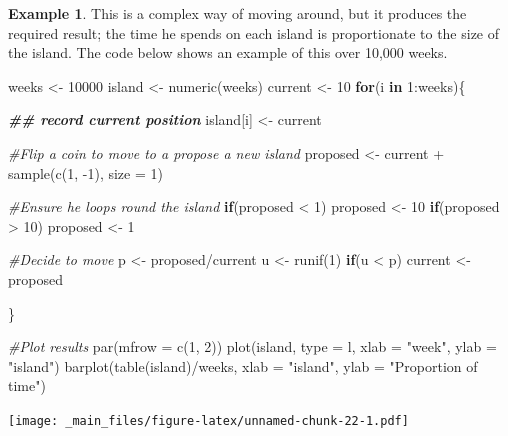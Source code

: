 \documentclass[
]{book}
\newenvironment{Shaded}{\begin{snugshade}}{\end{snugshade}}
\newcommand{\AttributeTok}[1]{\textcolor[rgb]{0.77,0.63,0.00}{#1}}
\newcommand{\CommentTok}[1]{\textcolor[rgb]{0.56,0.35,0.01}{\textit{#1}}}
\newcommand{\ControlFlowTok}[1]{\textcolor[rgb]{0.13,0.29,0.53}{\textbf{#1}}}
\newcommand{\DecValTok}[1]{\textcolor[rgb]{0.00,0.00,0.81}{#1}}
\newcommand{\DocumentationTok}[1]{\textcolor[rgb]{0.56,0.35,0.01}{\textbf{\textit{#1}}}}
\newcommand{\FunctionTok}[1]{\textcolor[rgb]{0.00,0.00,0.00}{#1}}
\newcommand{\NormalTok}[1]{#1}
\newcommand{\OtherTok}[1]{\textcolor[rgb]{0.56,0.35,0.01}{#1}}
\newcommand{\SpecialCharTok}[1]{\textcolor[rgb]{0.00,0.00,0.00}{#1}}
\newcommand{\StringTok}[1]{\textcolor[rgb]{0.31,0.60,0.02}{#1}}
\theoremstyle{definition}
\theoremstyle{definition}
\newtheorem{example}{Example}[chapter]
\theoremstyle{definition}
\theoremstyle{definition}
\theoremstyle{remark}
\begin{document}
\begin{example}
This is a complex way of moving around, but it produces the required result; the time he spends on each island is proportionate to the size of the island. The code below shows an example of this over 10,000 weeks.

\begin{Shaded}
\begin{Highlighting}[]
\NormalTok{weeks }\OtherTok{\textless{}{-}} \DecValTok{10000}
\NormalTok{island }\OtherTok{\textless{}{-}} \FunctionTok{numeric}\NormalTok{(weeks)}
\NormalTok{current }\OtherTok{\textless{}{-}} \DecValTok{10}
\ControlFlowTok{for}\NormalTok{(i }\ControlFlowTok{in} \DecValTok{1}\SpecialCharTok{:}\NormalTok{weeks)\{}
  
  \DocumentationTok{\#\# record current position}
\NormalTok{  island[i] }\OtherTok{\textless{}{-}}\NormalTok{ current}
  
  \CommentTok{\#Flip a coin to move to a propose a new island}
\NormalTok{  proposed }\OtherTok{\textless{}{-}}\NormalTok{ current }\SpecialCharTok{+} \FunctionTok{sample}\NormalTok{(}\FunctionTok{c}\NormalTok{(}\DecValTok{1}\NormalTok{, }\SpecialCharTok{{-}}\DecValTok{1}\NormalTok{), }\AttributeTok{size =} \DecValTok{1}\NormalTok{)}
  
  \CommentTok{\#Ensure he loops round the island}
  \ControlFlowTok{if}\NormalTok{(proposed }\SpecialCharTok{\textless{}} \DecValTok{1}\NormalTok{) }
\NormalTok{    proposed }\OtherTok{\textless{}{-}} \DecValTok{10}
  \ControlFlowTok{if}\NormalTok{(proposed }\SpecialCharTok{\textgreater{}} \DecValTok{10}\NormalTok{)}
\NormalTok{    proposed }\OtherTok{\textless{}{-}} \DecValTok{1}
  
  \CommentTok{\#Decide to move}
\NormalTok{  p }\OtherTok{\textless{}{-}}\NormalTok{ proposed}\SpecialCharTok{/}\NormalTok{current}
\NormalTok{  u }\OtherTok{\textless{}{-}} \FunctionTok{runif}\NormalTok{(}\DecValTok{1}\NormalTok{)}
  \ControlFlowTok{if}\NormalTok{(u }\SpecialCharTok{\textless{}}\NormalTok{ p)}
\NormalTok{    current }\OtherTok{\textless{}{-}}\NormalTok{ proposed}
  
  
\NormalTok{\}}

\CommentTok{\#Plot results}
\FunctionTok{par}\NormalTok{(}\AttributeTok{mfrow =} \FunctionTok{c}\NormalTok{(}\DecValTok{1}\NormalTok{, }\DecValTok{2}\NormalTok{))}
\FunctionTok{plot}\NormalTok{(island, }\AttributeTok{type =} \StringTok{\textquotesingle{}l\textquotesingle{}}\NormalTok{, }\AttributeTok{xlab =} \StringTok{"week"}\NormalTok{, }\AttributeTok{ylab =} \StringTok{"island"}\NormalTok{)}
\FunctionTok{barplot}\NormalTok{(}\FunctionTok{table}\NormalTok{(island)}\SpecialCharTok{/}\NormalTok{weeks, }\AttributeTok{xlab =} \StringTok{"island"}\NormalTok{, }\AttributeTok{ylab =} \StringTok{"Proportion of time"}\NormalTok{)}
\end{Highlighting}
\end{Shaded}

\texttt{[image: \_main\_files/figure-latex/unnamed-chunk-22-1.pdf]}
\end{example}
\end{document}
